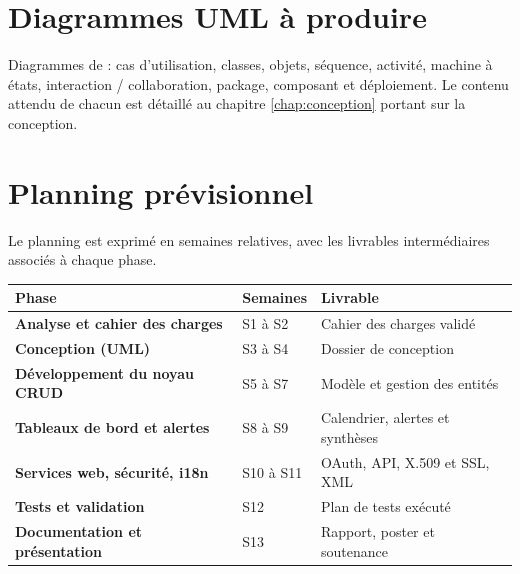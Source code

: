 \section{Diagrammes UML à produire}
Diagrammes de : cas d'utilisation, classes, objets, séquence, activité, machine
à états, interaction / collaboration, package, composant et déploiement. Le
contenu attendu de chacun est détaillé au chapitre \ref{chap:conception} portant
sur la conception.

\section{Planning prévisionnel}
Le planning est exprimé en semaines relatives, avec les livrables intermédiaires
associés à chaque phase.
\begin{longtable}{>{\bfseries}p{4.5cm} C{2.2cm} p{6.5cm}}
\toprule
\textbf{Phase} & \textbf{Semaines} & \textbf{Livrable} \\
\midrule
\endhead
Analyse et cahier des charges & S1 à S2 & Cahier des charges validé \\
Conception (UML) & S3 à S4 & Dossier de conception \\
Développement du noyau CRUD & S5 à S7 & Modèle et gestion des entités \\
Tableaux de bord et alertes & S8 à S9 & Calendrier, alertes et synthèses \\
Services web, sécurité, i18n & S10 à S11 & OAuth, API, X.509 et SSL, XML \\
Tests et validation & S12 & Plan de tests exécuté \\
Documentation et présentation & S13 & Rapport, poster et soutenance \\
\bottomrule
\end{longtable}


